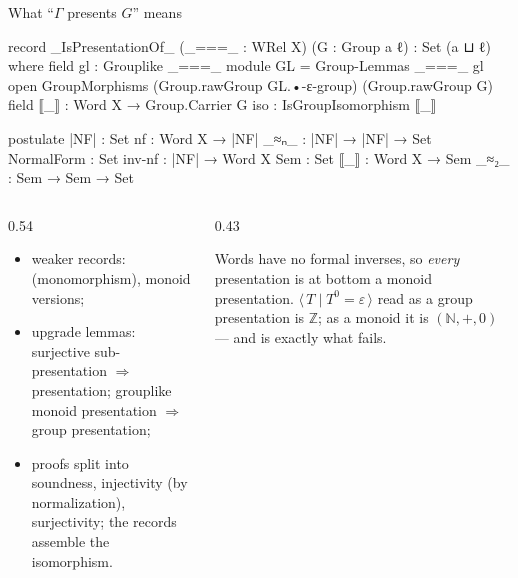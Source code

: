 \begin{frame}{What ``$\Gamma$ presents $G$'' means \InPaper}
\begin{code}
record _IsPresentationOf_ (_===_ : WRel X) (G : Group a ℓ) : Set (a ⊔ ℓ) where
  field gl : Grouplike _===_
  module GL = Group-Lemmas _===_ gl
  open GroupMorphisms (Group.rawGroup GL.•-ε-group) (Group.rawGroup G)
  field ⟦_⟧ : Word X → Group.Carrier G
        iso : IsGroupIsomorphism ⟦_⟧
\end{code}
\begin{code}[hide]
postulate
  |NF|       : Set
  nf         : Word X → |NF|
  _≈ₙ_       : |NF| → |NF| → Set
  NormalForm : Set
  inv-nf     : |NF| → Word X
  Sem        : Set
  ⟦_⟧        : Word X → Sem
  _≈₂_       : Sem → Sem → Set
\end{code}
\begin{columns}[c]
\begin{column}{0.54\textwidth}
\small
\begin{itemize}
  \item weaker records:  (monomorphism), monoid versions;
  \item upgrade lemmas: surjective sub-presentation $\Rightarrow$ presentation;
        grouplike monoid presentation $\Rightarrow$ group presentation;
  \item proofs split into soundness, injectivity (by normalization),
        surjectivity; the records assemble the isomorphism.
\end{itemize}
\end{column}
\begin{column}{0.43\textwidth}
\begin{keybox}[title=Monoid vs group: a real distinction]
\small Words have no formal inverses, so \emph{every} presentation is at
bottom a monoid presentation. $\langle\, T \mid T^{0} = \varepsilon\,\rangle$
read as a group presentation is $\mathbb{Z}$; as a \alert{monoid} it is
$(\mathbb{N},+,0)$ --- and  is exactly what fails.
\end{keybox}
\end{column}
\end{columns}
\end{frame}

